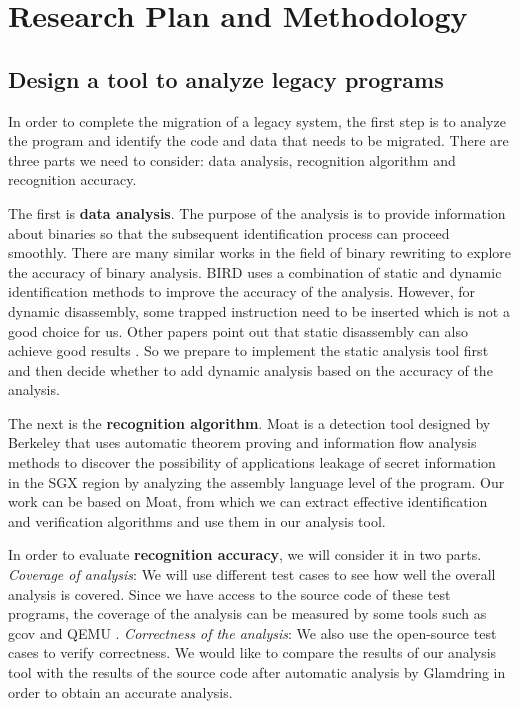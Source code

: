 \section{Research Plan and Methodology}
\subsection{Design a tool to analyze legacy programs} \label{sec:ToolToAnalyze}
In order to complete the migration of a legacy system, the first step is
to analyze the program and identify the code and data that needs to be migrated.
There are three parts we need to consider: data analysis, recognition algorithm
and recognition accuracy.

The first is \textbf{data analysis}. The purpose of the analysis is to provide
information about binaries so that the subsequent identification process can
proceed smoothly.
There are many similar works in the field of binary rewriting to explore
the accuracy of binary analysis.
BIRD \cite{Nanda2006BIRDBI} uses a combination of static and dynamic identification
methods to improve the accuracy of the analysis. However, for dynamic disassembly,
some trapped instruction need to be inserted which is not a good choice for us.
Other papers point out that static disassembly can also achieve good results
\cite{Andriesse2016AnIA}. So we prepare to implement the static analysis tool first
and then decide whether to add dynamic analysis based on the accuracy of the analysis.

The next is the \textbf{recognition algorithm}.
Moat \cite{Sinha2015MoatVC} is a detection tool designed by Berkeley that uses
automatic theorem proving and information flow analysis methods to discover the
possibility of applications leakage of secret information in the SGX region by
analyzing the assembly language level of the program.
Our work can be based on Moat, from which we can extract effective identification
and verification algorithms and use them in our analysis tool. 

In order to evaluate \textbf{recognition accuracy}, we will consider it in two parts.
\textit{Coverage of analysis}:
We will use different test cases to see how well the overall analysis is covered.
Since we have access to the source code of these test programs,
the coverage of the analysis can be measured by some tools such as gcov \cite{GCOV}
and QEMU \cite{Bellard2005QEMUAF}.
\textit{Correctness of the analysis}:
We also use the open-source test cases to verify correctness.
We would like to compare the results of our analysis tool with the results of the source code
after automatic analysis by Glamdring \cite{Lind2017GlamdringAA} in order to obtain
an accurate analysis.

